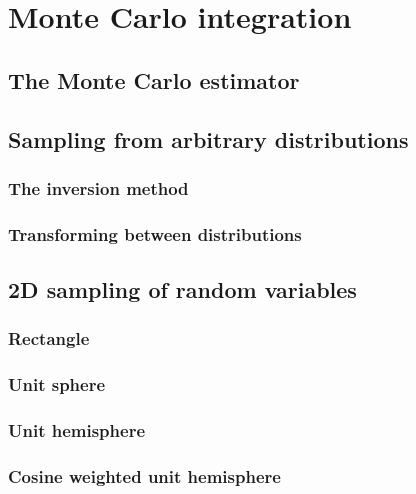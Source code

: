\chapter{Monte Carlo integration}

\section{The Monte Carlo estimator}

\section{Sampling from arbitrary distributions}

\subsection{The inversion method}

\subsection{Transforming between distributions}

\section{2D sampling of random variables}

\subsection{Rectangle}

\subsection{Unit sphere}

\subsection{Unit hemisphere}

\subsection{Cosine weighted unit hemisphere}

